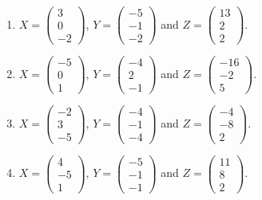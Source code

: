 \begin{enumerate}[label=\arabic*.,  leftmargin=*]
\item $X = \begin{pmatrix} 3 \\ 0 \\ -2 \end{pmatrix}$, $Y = \begin{pmatrix} -5 \\ -1 \\ -2 \end{pmatrix}$ and $Z = \begin{pmatrix} 13 \\ 2 \\ 2 \end{pmatrix}$.
\item $X = \begin{pmatrix} -5 \\ 0 \\ 1 \end{pmatrix}$, $Y = \begin{pmatrix} -4 \\ 2 \\ -1 \end{pmatrix}$ and $Z = \begin{pmatrix} -16 \\ -2 \\ 5 \end{pmatrix}$.
\item $X = \begin{pmatrix} -2 \\ 3 \\ -5 \end{pmatrix}$, $Y = \begin{pmatrix} -4 \\ -1 \\ -4 \end{pmatrix}$ and $Z = \begin{pmatrix} -4 \\ -8 \\ 2 \end{pmatrix}$.
\item $X = \begin{pmatrix} 4 \\ -5 \\ 1 \end{pmatrix}$, $Y = \begin{pmatrix} -5 \\ -1 \\ -1 \end{pmatrix}$ and $Z = \begin{pmatrix} 11 \\ 8 \\ 2 \end{pmatrix}$.

\end{enumerate}
